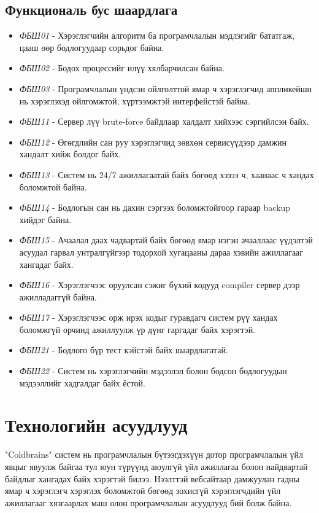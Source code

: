 \subsection{Функциональ бус шаардлага}
\begin{itemize}
  \item \textit{ФБШ01} - Хэрэглэгчийн алгоритм ба програмчлалын мэдлэгийг бататгаж, цааш өөр бодлогуудаар сорьдог байна.
  \item \textit{ФБШ02} - Бодох процессийг илүү хялбарчилсан байна.
  \item \textit{ФБШ03} - Програмчлалын үндсэн ойлголттой ямар ч хэрэглэгчид аппликейшн нь хэрэглэхэд ойлгомжтой, хүртээмжтэй интерфейстэй байна.
  \item \textit{ФБШ11} - Сервер лүү brute-force байдлаар халдалт хийхээс сэргийлсэн байх.
  \item \textit{ФБШ12} - Өгөгдлийн сан руу хэрэглэгчид зөвхөн сервисүүдээр дамжин хандалт хийж болдог байх.
  \item \textit{ФБШ13} - Систем нь 24/7 ажиллагаатай байх бөгөөд хэзээ ч, хаанаас ч хандах боломжтой байна.
  \item \textit{ФБШ14} -  Бодлогын сан нь дахин сэргээх боломжтойгоор гараар backup хийдэг байна.
  \item \textit{ФБШ15} - Ачаалал даах чадвартай байх бөгөөд ямар нэгэн ачааллаас үүдэлтэй асуудал гарвал унтралгүйгээр тодорхой хугацааны дараа хэвийн ажиллагааг хангадаг байх.
  \item \textit{ФБШ16} - Хэрэглэгчээс оруулсан сэжиг бүхий кодууд compiler сервер дээр ажилладаггүй байна.
  \item \textit{ФБШ17} - Хэрэглэгчээс орж ирэх кодыг гуравдагч систем рүү хандах боломжгүй орчинд ажиллуулж үр дүнг гаргадаг байх хэрэгтэй.
  \item \textit{ФБШ21} - Бодлого бүр тест кэйстэй байх шаардлагатай.
  \item \textit{ФБШ22} - Систем нь хэрэглэгчийн мэдээлэл болон бодсон бодлогуудын мэдээллийг хадгалдаг байх ёстой.
\end{itemize}

\clearpage

\section{Технологийн асуудлууд}
"Coldbrains" систем нь програмчлалын бүтээгдэхүүн дотор програмчлалын үйл явцыг явуулж байгаа тул юун түрүүнд аюулгүй үйл ажиллагаа болон найдвартай байдлыг хангадах байх хэрэгтэй билээ. Нээлттэй вебсайтаар дамжуулан гадны ямар ч хэрэглэгч хэрэглэх боломжтой бөгөөд зохисгүй хэрэглэгчдийн үйл ажиллагааг хязгаарлах маш олон програмчлалын асуудлууд бий болж байна.

